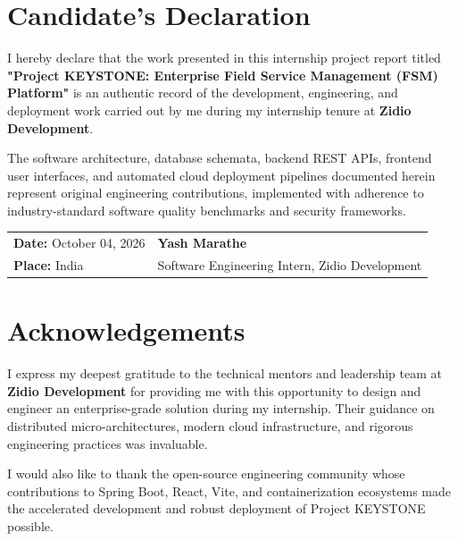 \documentclass[12pt,a4paper,oneside]{report}
\begin{document}
\newpage
\chapter*{Candidate's Declaration}

I hereby declare that the work presented in this internship project report titled \textbf{"Project KEYSTONE: Enterprise Field Service Management (FSM) Platform"} is an authentic record of the development, engineering, and deployment work carried out by me during my internship tenure at \textbf{Zidio Development}.

The software architecture, database schemata, backend REST APIs, frontend user interfaces, and automated cloud deployment pipelines documented herein represent original engineering contributions, implemented with adherence to industry-standard software quality benchmarks and security frameworks.

\vspace{2.5cm}

\noindent
\begin{tabular}{@{}p{}p{}@{}}
\textbf{Date:} October 04, 2026 & \textbf{Yash Marathe} \\
\textbf{Place:} India & Software Engineering Intern, Zidio Development \\
\end{tabular}

\newpage
\chapter*{Acknowledgements}

I express my deepest gratitude to the technical mentors and leadership team at \textbf{Zidio Development} for providing me with this opportunity to design and engineer an enterprise-grade solution during my internship. Their guidance on distributed micro-architectures, modern cloud infrastructure, and rigorous engineering practices was invaluable.

I would also like to thank the open-source engineering community whose contributions to Spring Boot, React, Vite, and containerization ecosystems made the accelerated development and robust deployment of Project KEYSTONE possible.
\end{document}
